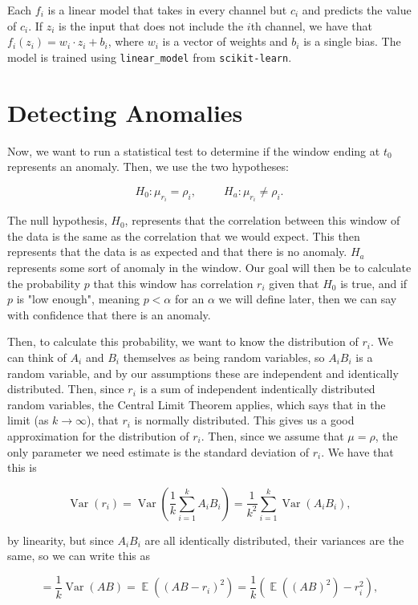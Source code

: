 \documentclass{article}
\DeclareMathOperator{\E}{\mathbb{E}}
\DeclareMathOperator{\Var}{\mathrm{Var}}
\begin{document}
Each $f_i$ is a linear model that takes in every channel but $c_i$ and predicts the value of $c_i$. If $z_i$ is the input that does not include the $i$th channel, we have that $f_i(z_i) = w_i \cdot z_i + b_i$, where $w_i$ is a vector of weights and $b_i$ is a single bias. The model is trained using \texttt{linear\_model} from \texttt{scikit-learn}.

\section{Detecting Anomalies}

Now, we want to run a statistical test to determine if the window ending at $t_0$ represents an anomaly. Then, we use the two hypotheses:

$$H_0: \mu_{r_i} = \rho_i,
~~~~~~~~~~~
H_a: \mu_{r_i} \ne \rho_i.$$

The null hypothesis, $H_0$, represents that the correlation between this window of the data is the same as the correlation that we would expect. This then represents that the data is as expected and that there is no anomaly. $H_a$ represents some sort of anomaly in the window. Our goal will then be to calculate the probability $p$ that this window has correlation $r_i$ given that $H_0$ is true, and if $p$ is "low enough", meaning $p < \alpha$ for an $\alpha$ we will define later, then we can say with confidence that there is an anomaly.

Then, to calculate this probability, we want to know the distribution of $r_i$. We can think of $A_i$ and $B_i$ themselves as being random variables, so $A_i B_i$ is a random variable, and by our assumptions these are independent and identically distributed. Then, since $r_i$ is a sum of independent indentically distributed random variables, the Central Limit Theorem applies, which says that in the limit (as $k \to \infty$), that $r_i$ is normally distributed. This gives us a good approximation for the distribution of $r_i$. Then, since we assume that $\mu = \rho$, the only parameter we need estimate is the standard deviation of $r_i$. We have that this is

$$\Var(r_i) = \Var(\frac{1}{k} \sum_{i = 1}^k A_i B_i) = \frac{1}{k^2} \sum_{i =1}^k \Var(A_i B_i),$$

by linearity, but since $A_i B_i$ are all identically distributed, their variances are the same, so we can write this as

$$ = \frac{1}{k} \Var(AB) = \E((AB - r_i)^2) = \frac{1}{k}\left(\E((AB)^2) - r_i^2\right),$$
\end{document}
